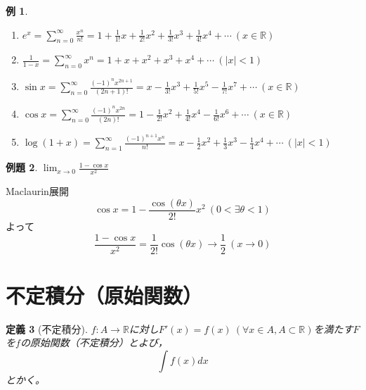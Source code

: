 \documentclass[dvipdfmx,a4j,10pt]{jsarticle}
\makeatletter
\theoremstyle{mystyle1}
\newtheorem{dfn}{定義}[part]
\newtheorem{ex}[dfn]{例題}
\newtheorem{example}[dfn]{例}
\theoremstyle{mystyle2}
\newtheorem{ans}{解答}
\renewenvironment{ans}[1][解答]{\par
  \pushQED{\qed}%
  \normalfont
  \topsep6\p@\@plus6\p@ \trivlist
  \item[\hskip\labelsep{\bfseries\sffamily #1}]\ignorespaces
}{%
  \popQED\endtrivlist\@endpefalse
}
\makeatother
\begin{document}
\newpage

\begin{shaded}
    \begin{example}\label{ex8.4}\
        \begin{enumerate}
            \item
            $\displaystyle e^x=\sum_{n=0}^\infty \frac{x^n}{n!}=1+\frac{1}{1!}x+\frac{1}{2!}x^2+\frac{1}{3!}x^3+\frac{1}{4!}x^4+\cdots\ (x\in\mathbb{R})$
            \item
            $\displaystyle \frac{1}{1-x}=\sum_{n=0}^\infty x^n=1+x+x^2+x^3+x^4+\cdots\ (|x|<1)$
            \item
            $\displaystyle \sin x=\sum_{n=0}^\infty\frac{(-1)^n x^{2n+1}}{(2n+1)!}=x-\frac{1}{3!}x^3+\frac{1}{5!}x^5-\frac{1}{7!}x^7+\cdots\ (x\in\mathbb{R})$
            \item
            $\displaystyle \cos x=\sum_{n=0}^\infty\frac{(-1)^n x^{2n}}{(2n)!}=1-\frac{1}{2!}x^2+\frac{1}{4!}x^4-\frac{1}{6!}x^6+\cdots\ (x\in\mathbb{R})$
            \item
            $\displaystyle \log{(1+x)}=\sum_{n=1}^\infty\frac{(-1)^{n+1}x^n}{n!}=x-\frac{1}{2}x^2+\frac{1}{3}x^3-\frac{1}{4}x^4+\cdots\ (|x|<1)$
        \end{enumerate}
    \end{example}
\end{shaded}

\begin{shaded}
    \begin{ex}\label{ex8.5}
        $\displaystyle\lim_{x\to0}\frac{1-\cos{x}}{x^2}$
    \end{ex}
\end{shaded}

\begin{ans}[例題\ref{ex8.5}の解答]
    Maclaurin展開
    \[
    \cos{x}=1-\frac{\cos{(\theta x)}}{2!}x^2\ (0<\exists\theta<1)
    \]
    よって
    \[
    \frac{1-\cos{x}}{x^2}=\frac{1}{2!}\cos{(\theta x)}\to\frac{1}{2}\ (x\to0)
    \]
\end{ans}


\newpage

\section{不定積分（原始関数）}
\begin{framed}
    \begin{dfn}[不定積分]\label{def9.1}
        $f:A\to\mathbb{R}$に対し$F'(x)=f(x)\ (\forall x\in A,A\subset\mathbb{R})$を満たす$F$を$f$の原始関数（不定積分）とよび，
        \[
        \int f(x) dx
        \]
        とかく。
    \end{dfn}
\end{framed}
\end{document}
